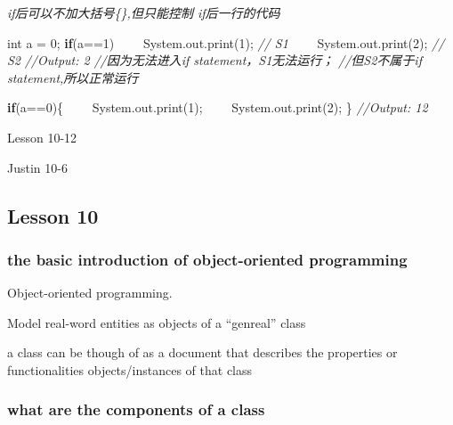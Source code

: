 \documentclass[
  paper=a4,
  ,captions=tableheading
]{scrartcl}
\newenvironment{Shaded}{}{}
\newcommand{\CommentTok}[1]{\textcolor[rgb]{0.38,0.63,0.69}{\textit{#1}}}
\newcommand{\DataTypeTok}[1]{\textcolor[rgb]{0.56,0.13,0.00}{#1}}
\newcommand{\DecValTok}[1]{\textcolor[rgb]{0.25,0.63,0.44}{#1}}
\newcommand{\FunctionTok}[1]{\textcolor[rgb]{0.02,0.16,0.49}{#1}}
\newcommand{\KeywordTok}[1]{\textcolor[rgb]{0.00,0.44,0.13}{\textbf{#1}}}
\newcommand{\NormalTok}[1]{#1}
\begin{document}
\emph{if后可以不加大括号\{\},但只能控制 if后一行的代码}

\begin{Shaded}
\begin{Highlighting}[]
\DataTypeTok{int}\NormalTok{ a = }\DecValTok{0}\NormalTok{;}
\KeywordTok{if}\NormalTok{(a==}\DecValTok{1}\NormalTok{)}
\NormalTok{    System.}\FunctionTok{out}\NormalTok{.}\FunctionTok{print}\NormalTok{(}\DecValTok{1}\NormalTok{); }\CommentTok{// S1}
\NormalTok{    System.}\FunctionTok{out}\NormalTok{.}\FunctionTok{print}\NormalTok{(}\DecValTok{2}\NormalTok{); }\CommentTok{// S2}
\CommentTok{//Output: 2}
\CommentTok{//因为无法进入if statement，S1无法运行；}
\CommentTok{//但S2不属于if statement,所以正常运行}

\KeywordTok{if}\NormalTok{(a==}\DecValTok{0}\NormalTok{)\{}
\NormalTok{    System.}\FunctionTok{out}\NormalTok{.}\FunctionTok{print}\NormalTok{(}\DecValTok{1}\NormalTok{);}
\NormalTok{    System.}\FunctionTok{out}\NormalTok{.}\FunctionTok{print}\NormalTok{(}\DecValTok{2}\NormalTok{);}
\NormalTok{\}}
\CommentTok{//Output: 12}
\end{Highlighting}
\end{Shaded}

Lesson 10-12

Justin 10-6

\hypertarget{lesson-10}{%
\subsection{Lesson 10}\label{lesson-10}}

\hypertarget{the-basic-introduction-of-object-oriented-programming}{%
\subsubsection{the basic introduction of object-oriented
programming}\label{the-basic-introduction-of-object-oriented-programming}}

Object-oriented programming.

Model real-word entities as objects of a \enquote{genreal} class

a class can be though of as a document that describes the properties or
functionalities objects/instances of that class

\hypertarget{what-are-the-components-of-a-class}{%
\subsubsection{what are the components of a
class}\label{what-are-the-components-of-a-class}}
\end{document}
